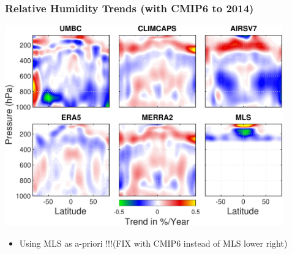 \documentclass[10pt,t]{beamer}
\begin{document}
\begin{frame}
\frametitle{Relative Humidity Trends (with CMIP6 to 2014)}  
\vspace{-0.15in}
\begin{center}
\includegraphics[width=0.9\textwidth]{Figslls/tiled_all_N_RH_trend_withmls_start.pdf}
\end{center}

\small
\begin{itemize}
\item Using MLS as a-priori   !!!(FIX with CMIP6 instead of MLS lower right)
\end{itemize}
\end{frame}
\end{document}
